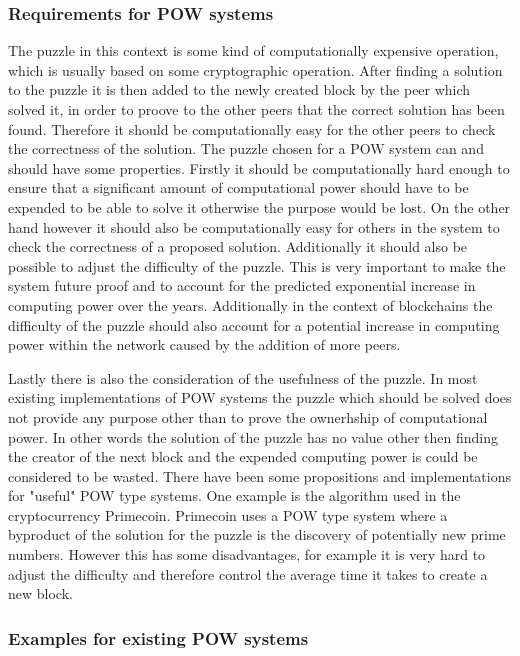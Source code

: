 \subsubsection{Requirements for POW systems}

The puzzle in this context is some kind of computationally expensive operation, which is usually based on some cryptographic operation. After finding a solution to the puzzle it is then added to the 
newly created
block by the peer which solved it, in order to proove to the other peers that the correct solution has been found. Therefore it should be computationally easy for the other peers to check the correctness 
of the solution.
The puzzle chosen for a POW system can and should have some properties. Firstly it should be computationally hard enough to ensure that a significant amount of computational power should have 
to be expended to be able to solve it otherwise the purpose would be lost. On the other hand however it should also be computationally easy for others in the system to check the correctness 
of a proposed solution. Additionally it should also be possible to adjust the difficulty of the puzzle. This is very important to make the system future proof and to account for the predicted
exponential increase in computing power over the years.\cite{url:moore_law} Additionally in the context of blockchains the difficulty of the puzzle should also account for a potential
increase in computing power within the network caused by the addition of more peers.\par
Lastly there is also the consideration of the usefulness of the puzzle. In most existing implementations
of POW systems the puzzle which should be solved does not provide any purpose other than to prove the ownerhship of computational power. 
In other words the solution of the puzzle has no value other then finding the creator of the next block
and the expended computing power is could be considered to be wasted.\cite{url:pow_useless} There have been some propositions and implementations for "useful" POW type systems. One example is
the algorithm used in the cryptocurrency Primecoin. Primecoin uses a POW type system where a byproduct of the solution for the puzzle is the discovery of potentially new prime numbers.\cite{url:primecoin}
However this has some disadvantages, for example it is very hard to adjust the difficulty and therefore control the average time it takes to create a new block.

\subsubsection{Examples for existing POW systems}

